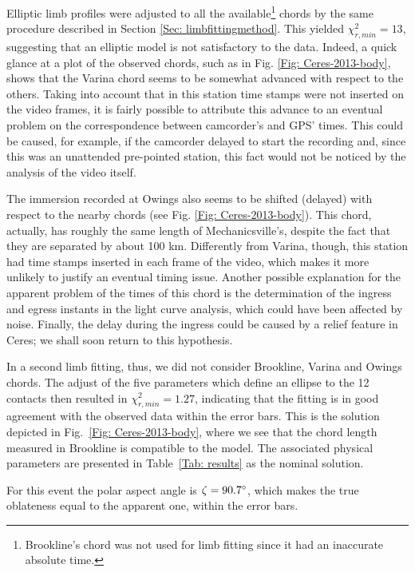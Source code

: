 \documentclass[useAMS,usenatbib]{mn2e}
\begin{document}
Elliptic limb profiles were adjusted to all the available\footnote{Brookline's chord was not used for limb fitting since it had an inaccurate absolute time.} chords by the same procedure described in Section \ref{Sec: limbfittingmethod}.%
This yielded $\chi^2_{r,min} = 13$, suggesting that an elliptic model is not satisfactory to the data. Indeed, a quick glance at a plot of the observed chords, such as in Fig. \ref{Fig: Ceres-2013-body}, shows that the Varina chord seems to be somewhat advanced with respect to the others. Taking into account that in this station time stamps were not inserted on the video frames, it is fairly possible to attribute this advance to an eventual problem on the correspondence between camcorder's and GPS' times. This could be caused, for example, if the camcorder delayed to start the recording and, since this was an unattended pre-pointed station, this fact would not be noticed by the analysis of the video itself.

The immersion recorded at Owings also seems to be shifted (delayed) with respect to the nearby chords (see Fig. \ref{Fig: Ceres-2013-body}). This chord, actually, has roughly the same length of Mechanicsville's, despite the fact that they are separated by about 100 km. Differently from Varina, though, this station had time stamps inserted in each frame of the video, which makes it more unlikely to justify an eventual timing issue. Another possible explanation for the apparent problem of the times of this chord is the determination of the ingress and egress instants in the light curve analysis, which could have been affected by noise. Finally, the delay during the ingress could be caused by a relief feature in Ceres; we shall soon return to this hypothesis.

In a second limb fitting, thus, we did not consider Brookline, Varina and Owings chords. The adjust of the five parameters which define an ellipse to the 12 contacts then resulted in $\chi^2_{r,min} = 1.27$, indicating that the fitting is in good agreement with the observed data within the error bars. This is the solution depicted in Fig.~\ref{Fig: Ceres-2013-body}, where we see that the chord length measured in Brookline is compatible to the model. The associated physical parameters are presented in Table~\ref{Tab: results} as the nominal solution.

For this event the polar aspect angle is $\zeta = 90.7\hbox{$^\circ$}$, which makes the true oblateness equal to the apparent one, within the error bars.
\end{document}

